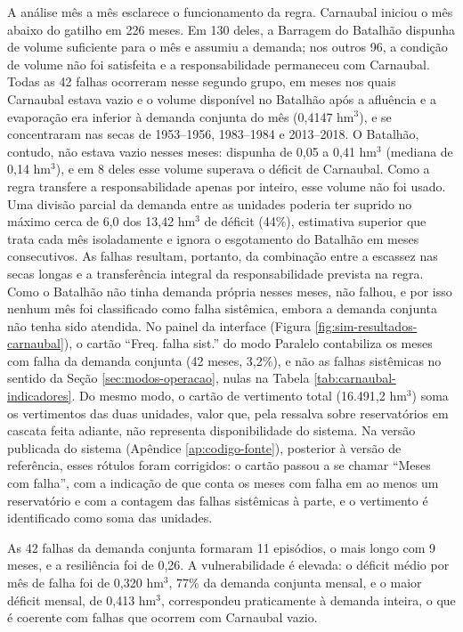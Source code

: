 A análise mês a mês esclarece o funcionamento da regra. Carnaubal iniciou o mês abaixo do gatilho em 226 meses. Em 130 deles, a Barragem do Batalhão dispunha de volume suficiente para o mês e assumiu a demanda; nos outros 96, a condição de volume não foi satisfeita e a responsabilidade permaneceu com Carnaubal. Todas as 42 falhas ocorreram nesse segundo grupo, em meses nos quais Carnaubal estava vazio e o volume disponível no Batalhão após a afluência e a evaporação era inferior à demanda conjunta do mês (0,4147 hm$^3$), e se concentraram nas secas de 1953--1956, 1983--1984 e 2013--2018. O Batalhão, contudo, não estava vazio nesses meses: dispunha de 0,05 a 0,41 hm$^3$ (mediana de 0,14 hm$^3$), e em 8 deles esse volume superava o déficit de Carnaubal. Como a regra transfere a responsabilidade apenas por inteiro, esse volume não foi usado. Uma divisão parcial da demanda entre as unidades poderia ter suprido no máximo cerca de 6,0 dos 13,42 hm$^3$ de déficit (44\%), estimativa superior que trata cada mês isoladamente e ignora o esgotamento do Batalhão em meses consecutivos. As falhas resultam, portanto, da combinação entre a escassez nas secas longas e a transferência integral da responsabilidade prevista na regra. Como o Batalhão não tinha demanda própria nesses meses, não falhou, e por isso nenhum mês foi classificado como falha sistêmica, embora a demanda conjunta não tenha sido atendida. No painel da interface (Figura \ref{fig:sim-resultados-carnaubal}), o cartão ``Freq. falha sist.'' do modo Paralelo contabiliza os meses com falha da demanda conjunta (42 meses, 3,2\%), e não as falhas sistêmicas no sentido da Seção \ref{sec:modos-operacao}, nulas na Tabela \ref{tab:carnaubal-indicadores}. Do mesmo modo, o cartão de vertimento total (16.491,2 hm$^3$) soma os vertimentos das duas unidades, valor que, pela ressalva sobre reservatórios em cascata feita adiante, não representa disponibilidade do sistema. Na versão publicada do sistema (Apêndice \ref{ap:codigo-fonte}), posterior à versão de referência, esses rótulos foram corrigidos: o cartão passou a se chamar ``Meses com falha'', com a indicação de que conta os meses com falha em ao menos um reservatório e com a contagem das falhas sistêmicas à parte, e o vertimento é identificado como soma das unidades.

As 42 falhas da demanda conjunta formaram 11 episódios, o mais longo com 9 meses, e a resiliência foi de 0,26. A vulnerabilidade é elevada: o déficit médio por mês de falha foi de 0,320 hm$^3$, 77\% da demanda conjunta mensal, e o maior déficit mensal, de 0,413 hm$^3$, correspondeu praticamente à demanda inteira, o que é coerente com falhas que ocorrem com Carnaubal vazio.

